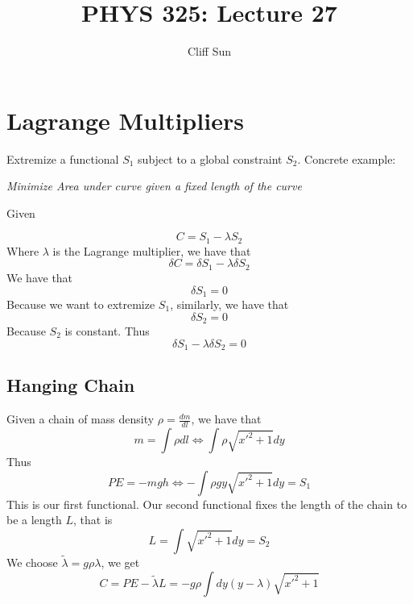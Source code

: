 \documentclass{article}
\title{PHYS 325: Lecture 27}
\author{Cliff Sun}
\newtheorem{one minute paper}[theorem]{One Minute Paper}
\begin{document}
\maketitle

\section*{Lagrange Multipliers}

Extremize a functional $S_1$ subject to a global constraint $S_2$. Concrete example:
\begin{center}
    \textit{Minimize Area under curve given a fixed length of the curve}
\end{center}

Given 

\begin{equation}
    C = S_1 - \lambda S_2
\end{equation}
Where $\lambda$ is the Lagrange multiplier, we have that 
\begin{equation}
    \delta C = \delta S_1 - \lambda \delta S_2
\end{equation}
We have that 
\begin{equation}
    \delta S_1 = 0
\end{equation}
Because we want to extremize $S_1$, similarly, we have that 
\begin{equation}
    \delta S_2 = 0
\end{equation}
Because $S_2$ is constant. Thus 
\begin{equation}
    \delta S_1 - \lambda \delta S_2 = 0
\end{equation}
\subsection*{Hanging Chain}
Given a chain of mass density $\rho = \frac{dm}{dl}$, we have that 
\begin{equation}
    m = \int \rho dl \iff \int \rho \sqrt{x'^2 + 1}dy
\end{equation}
Thus
\begin{equation}
    PE = -mgh \iff -\int \rho gy\sqrt{x'^2 + 1}dy = S_1
\end{equation}
This is our first functional. Our second functional fixes the length of the chain to be a length $L$, that is 
\begin{equation}
    L = \int \sqrt{x'^2 + 1}dy = S_2
\end{equation}
We choose $\tilde{\lambda} = g\rho\lambda$, we get 
\begin{equation}
    C = PE - \tilde{\lambda}L = -g\rho \int dy (y - \lambda)\sqrt{x'^2 + 1}
\end{equation}
\end{document}
